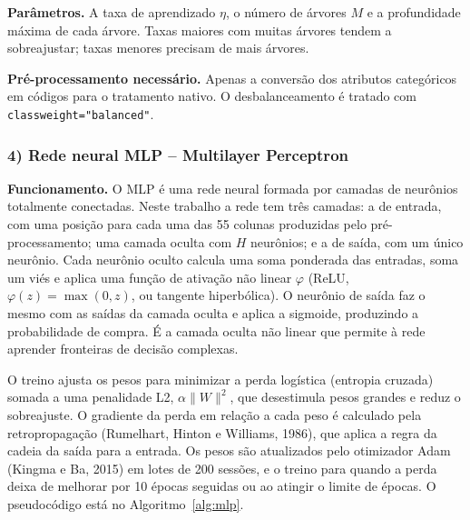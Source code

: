 \documentclass[11pt,a4paper]{article}
\DeclareRobustCommand{\atr}[1]{{\renewcommand{\_}{\textunderscore\allowbreak}\texttt{#1}}}
\begin{document}
\textbf{Parâmetros.} A taxa de aprendizado $\eta$, o número de árvores $M$ e a profundidade máxima de cada árvore.
Taxas maiores com muitas árvores tendem a sobreajustar; taxas menores precisam de mais árvores.

\textbf{Pré-processamento necessário.} Apenas a conversão dos atributos categóricos em códigos para o tratamento
nativo. O desbalanceamento é tratado com \atr{class\_weight="balanced"}.

\subsubsection*{4) Rede neural MLP -- Multilayer Perceptron}

\textbf{Funcionamento.} O MLP é uma rede neural formada por camadas de neurônios totalmente conectadas. Neste trabalho
a rede tem três camadas: a de entrada, com uma posição para cada uma das 55 colunas produzidas pelo
pré-processamento; uma camada oculta com $H$ neurônios; e a de saída, com um único neurônio. Cada neurônio oculto
calcula uma soma ponderada das entradas, soma um viés e aplica uma função de ativação não linear $\varphi$ (ReLU,
$\varphi(z) = \max(0, z)$, ou tangente hiperbólica). O neurônio de saída faz o mesmo com as saídas da camada oculta e
aplica a sigmoide, produzindo a probabilidade de compra. É a camada oculta não linear que permite à rede aprender
fronteiras de decisão complexas.

O treino ajusta os pesos para minimizar a perda logística (entropia cruzada) somada a uma penalidade L2,
$\alpha\lVert W\rVert^2$, que desestimula pesos grandes e reduz o sobreajuste. O gradiente da perda em relação a cada
peso é calculado pela retropropagação (Rumelhart, Hinton e Williams, 1986), que aplica a regra da cadeia da saída para
a entrada. Os pesos são atualizados pelo otimizador Adam (Kingma e Ba, 2015) em lotes de 200 sessões, e o treino para
quando a perda deixa de melhorar por 10 épocas seguidas ou ao atingir o limite de épocas. O pseudocódigo está no
Algoritmo~\ref{alg:mlp}.
\end{document}
